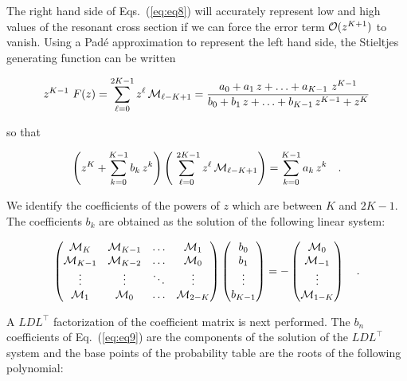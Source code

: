 \vskip 0.1cm

The right hand side of Eqs.~(\ref{eq:eq8}) will accurately represent low and
high values of the resonant cross section if we can force the error term
${\cal O}(z^{K+1})$ to vanish. Using a Pad\'e approximation to represent the
left hand side, the Stieltjes generating function can be written

\begin{equation}
z^{K-1} \ F(z)=\sum_{\ell=0}^{2K-1} z^\ell \, {\cal M}_{\ell-K+1}={a_0+a_1 \,
z+\ldots+a_{K-1}\ z^{K-1} \over b_0+b_1 \, z+\ldots+b_{K-1}\, z^{K-1}+z^K}
\label{eq:eq9}
\end{equation}

\noindent so that

\begin{equation}
\left(z^K+\sum_{k=0}^{K-1} b_k \, z^k\right) \left(\sum_{\ell=0}^{\ 2K-1} z^\ell
\, {\cal M}_{\ell-K+1}\right)=\sum_{k=0}^{K-1} a_k \, z^k \ \ \ .
\label{eq:eq9a}
\end{equation}

\vskip 0.1cm

We identify the coefficients of the powers of $z$ which are between $K$ and
$2K-1$. The coefficients $b_k$ are obtained as the solution of the following
linear system:

\begin{equation}
\left(\begin{matrix} {\cal M}_{K}  &{\cal M}_{K-1}&\ldots&{\cal M}_{1}\cr
         {\cal M}_{K-1}&{\cal M}_{K-2}&\ldots&{\cal M}_{0}\cr
         \vdots        &\vdots       &\ddots &\vdots      \cr
         {\cal M}_{1} &{\cal M}_{0}  &\ldots &{\cal M}_{2-K}\end{matrix}\right)
\left(\begin{matrix} b_0\cr b_1\cr \vdots \cr b_{K-1}\end{matrix}\right)=-
\left(\begin{matrix} {\cal M}_{0}\cr {\cal M}_{-1}\cr \vdots \cr {\cal M}_{1-K}
\end{matrix}\right) \ \ \ .
\label{eq:eq10}
\end{equation}

\vskip 0.2cm

A $L D L^\top$ factorization of the coefficient matrix is next performed.
The $b_n$ coefficients of Eq.~(\ref{eq:eq9}) are the components of
the solution of the $L D L^\top$ system and the base points of the probability
table are the roots of the following polynomial:

\vskip -0.2cm

